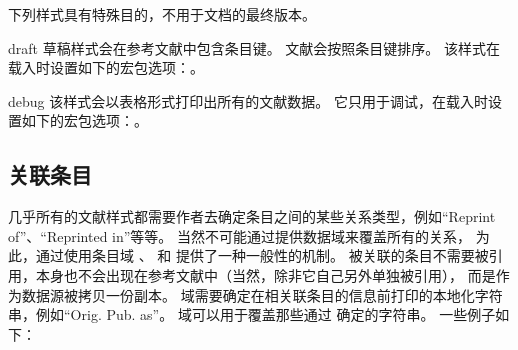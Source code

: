 下列样式具有特殊目的，不用于文档的最终版本。

\begin{marglist}

\item[draft]
草稿样式会在参考文献中包含条目键。
文献会按照条目键排序。
该样式在载入时设置如下的宏包选项：。

\item[debug]
该样式会以表格形式打印出所有的文献数据。
它只用于调试，在载入时设置如下的宏包选项：。

\end{marglist}

\subsection{关联条目}%
\label{use:rel}


几乎所有的文献样式都需要作者去确定条目之间的某些关系类型，例如“Reprint of”、“Reprinted in”等等。
当然不可能通过提供数据域来覆盖所有的关系，
为此，\biblatex 通过使用条目域 、 和  提供了一种一般性的机制。
被关联的条目不需要被引用，本身也不会出现在参考文献中（当然，除非它自己另外单独被引用），
而是作为数据源被拷贝一份副本。
 域需要确定在相关联条目的信息前打印的本地化字符串，例如“Orig. Pub. as”。
 域可以用于覆盖那些通过  确定的字符串。
一些例子如下：

